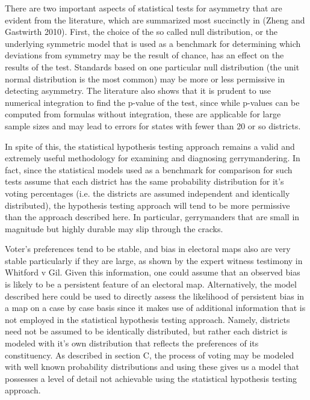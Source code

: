\documentclass[preprint,12pt]{article}
\begin{document}
There are two important aspects of statistical tests for asymmetry that are evident from the literature, which are summarized most succinctly in (Zheng and Gastwirth 2010). First, the choice of the so called null distribution, or the underlying symmetric model that is used as a benchmark for determining which deviations from symmetry may be the result of chance, has an effect on the results of the test. Standards based on one particular null distribution (the unit normal distribution is the most common) may be more or less permissive in detecting asymmetry. The literature also shows that it is prudent to use numerical integration to find the p-value of the test, since while p-values can be computed from formulas without integration, these are applicable for large sample sizes and may lead to errors for states with fewer than 20 or so districts. 
 
In spite of this, the statistical hypothesis testing approach remains a valid and extremely useful methodology for examining and diagnosing gerrymandering. In fact, since the statistical models used as a benchmark for comparison for such tests assume that each district has the same probability distribution for it's voting percentages (i.e. the districts are assumed independent and identically distributed), the hypothesis testing approach will tend to be more permissive than the approach described here. In particular, gerrymanders that are small in magnitude but highly durable may slip through the cracks. 
 
Voter's preferences tend to be stable, and bias in electoral maps also are very stable particularly if they are large, as shown by the expert witness testimony in Whitford v Gil. Given this information, one could assume that an observed bias is likely to be a persistent feature of an electoral map. Alternatively, the model described here could be used to directly assess the likelihood of persistent bias in a map on a case by case basis since it makes use of additional information that is not employed in the statistical hypothesis testing approach. Namely, districts need not be assumed to be identically distributed, but rather each district is modeled with it's own distribution that reflects the preferences of its constituency. As described in section C, the process of voting may be modeled with well known probability distributions and using these gives us a model that possesses a level of detail not achievable using the statistical hypothesis testing approach.
 
\end{document}
